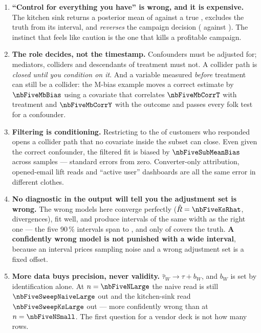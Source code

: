 \begin{enumerate}[leftmargin=*, itemsep=.45em]
  \item \textbf{``Control for everything you have'' is wrong, and it is expensive.} The kitchen
        sink returns a posterior mean of \eur{\nbFiveKsBayesEst} against a true
        \eur{\nbFiveTrueAte}, excludes the truth
        from its interval, and \emph{reverses} the campaign decision
        (\nbFiveDecisionKs{} against \nbFiveDecision). The instinct that feels like caution is
        the one that kills a profitable campaign.

  \item \textbf{The role decides, not the timestamp.} Confounders must be adjusted for; mediators,
        colliders and descendants of treatment must not. A collider path is \emph{closed until you
        condition on it}. And a variable measured \emph{before} treatment can still be a collider:
        the M-bias example moves a correct estimate by $\nbFiveMbBias$ using a covariate that
        correlates $\nbFiveMbCorrT$ with treatment and $\nbFiveMbCorrY$ with the outcome and
        passes every folk test for a confounder.

  \item \textbf{Filtering is conditioning.} Restricting to the \pc{\nbFiveSubPct} of customers who
        responded opens a collider path that no covariate inside the subset can close. Even given
        the correct confounder, the filtered fit is biased by $\nbFiveSubMeanBias$ across
        \nbFiveSubNs{} samples --- \nbFiveSubT{} standard errors from zero. Converter-only
        attribution, opened-email lift reads and ``active user'' dashboards are all the same
        error in different clothes.

  \item \textbf{No diagnostic in the output will tell you the adjustment set is wrong.} The wrong
        models here converge perfectly ($\hat R = \nbFiveKsRhat$, \nbFiveKsDivergences{}
        divergences), fit well, and produce intervals of the same width as the right one --- the
        five 90\,\% intervals span \eur{\nbFiveWidthMin} to \eur{\nbFiveWidthMax}, and only
        \nbFiveNCover{} of \nbFiveNSets{} covers the truth. \textbf{A confidently wrong model is
        not punished with a wide interval}, because an interval prices sampling noise and a
        wrong adjustment set is a fixed offset.

  \item \textbf{More data buys precision, never validity.} $\hat\tau_W \to \tau + b_W$, and $b_W$
        is set by identification alone. At $n = \nbFiveNLarge$ the naive read is still
        $\nbFiveSweepNaiveLarge$ out and the kitchen-sink read $\nbFiveSweepKsLarge$ out --- more
        confidently wrong than at $n = \nbFiveNSmall$. The first question for a vendor deck is not
        how many rows.


\end{enumerate}
